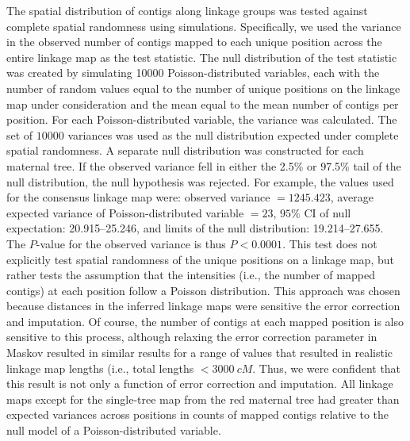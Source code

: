 \documentclass[smallextended]{svjour3}
\begin{document}
The spatial distribution of contigs along linkage groups was tested against
complete spatial randomness using simulations.  Specifically, we used the
variance in the observed number of contigs mapped to each unique position across
the entire linkage map as the test statistic. The null distribution of the test
statistic was created by simulating \num{10000} Poisson-distributed variables, each
with the number of random values equal to the number of unique positions on the
linkage map under consideration and the mean equal to the mean number of contigs
per position. For each Poisson-distributed variable, the variance was
calculated. The set of $10000$ variances was used as the null distribution
expected under complete spatial randomness. A separate null distribution was
constructed for each maternal tree. If the observed variance fell in either the
2.5\% or 97.5\% tail of the null distribution, the null hypothesis was
rejected. For example, the values used for the consensus linkage map were:
observed variance $= 1245.423$, average expected variance of Poisson-distributed
variable $= 23$, $95\%$ CI of null expectation: 20.915--25.246, and limits of
the null distribution: 19.214--27.655.  The $P$-value for the observed
variance is thus $P < 0.0001$. This test does not explicitly test spatial
randomness of the unique positions on a linkage map, but rather tests the
assumption that the intensities (i.e., the number of mapped contigs) at each
position follow a Poisson distribution.  This approach was chosen because
distances in the inferred linkage maps were sensitive the error correction and
imputation. Of course, the number of contigs at each mapped position is also
sensitive to this process, although relaxing the error correction parameter in
Maskov resulted in similar results for a range of values that resulted in
realistic linkage map lengths (i.e., total lengths $< \SI{3000}{cM}$. Thus, we were
confident that this result is not only a function of error correction and
imputation. All linkage maps except for the single-tree map from the red
maternal tree had greater than expected variances across positions in counts of
mapped contigs relative to the null model of a Poisson-distributed variable.
\end{document}
